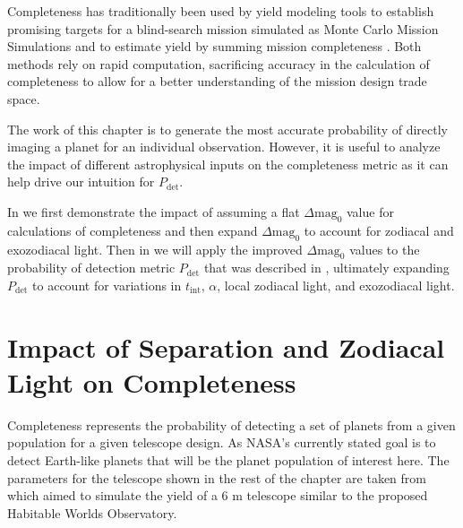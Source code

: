 Completeness has traditionally been used by yield modeling tools to establish
promising targets for a blind-search mission simulated as Monte Carlo
Mission Simulations \citep{savranskyEXOSIMSExoplanetOpenSource2017}
and to estimate yield by summing mission completeness
\citep{Brown2005d}. Both
methods rely on rapid computation, sacrificing accuracy in the calculation of
completeness to allow for a better understanding of the mission design trade
space.

The work of this chapter is to generate the most accurate probability of
directly imaging a planet for an individual observation. However, it is useful
to analyze the impact of different astrophysical inputs on the completeness
metric as it can help drive our intuition for $P_\textrm{det}$.

In  we  first demonstrate the impact of
assuming a flat $\Delta\textrm{mag}_0$ value for calculations of completeness
and then expand $\Delta\textrm{mag}_0$ to account for zodiacal and exozodiacal light. Then in
 we will apply the improved $\Delta\textrm{mag}_0$ values to the probability of
detection metric $P_\textrm{det}$ that was described in ,
ultimately expanding $P_\textrm{det}$ to account for variations in $t_\textrm{int}$, $\alpha$,
local zodiacal light, and exozodiacal light.


\section{Impact of Separation and Zodiacal Light on Completeness}
\label{sec:impact_on_completeness}

Completeness represents the probability of detecting a set of planets from a
given population for a given telescope design. As NASA's currently stated goal
is to detect Earth-like planets \citep{nasaNASAStrategic2022} that will be the planet population of interest
here. The parameters for the telescope shown in the rest of the chapter are
taken from \citet{morganExplorationExpectedNumber2022a} which aimed to simulate
the yield of a 6 m telescope similar to the proposed Habitable Worlds
Observatory.


